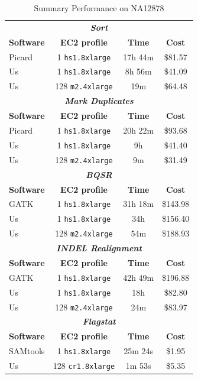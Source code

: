 \documentclass{acm_proc_article-sp}
\begin{document}
\begin{table}[h]
\caption{Summary Performance on NA12878}
\label{tab:overview}
\begin{center}
\begin{tabular}{ l c c c }
\hline
\multicolumn{4}{c}{\bf \textit{Sort}} \\
\bf Software & \bf EC2 profile & \bf Time & \bf Cost \\
\hline
Picard & 1 \texttt{hs1.8xlarge} & 17h 44m & \$81.57 \\
Us & 1 \texttt{hs1.8xlarge} & 8h 56m & \$41.09 \\
Us & 128 \texttt{m2.4xlarge} & 19m & \$64.48 \\ 
\hline
\multicolumn{4}{c}{\bf \textit{Mark Duplicates}} \\
\bf Software & \bf EC2 profile & \bf Time & \bf Cost  \\
\hline
Picard & 1 \texttt{hs1.8xlarge} & 20h 22m & \$93.68 \\
Us & 1 \texttt{hs1.8xlarge} & 9h & \$41.40 \\
Us & 128 \texttt{m2.4xlarge} & 9m & \$31.49 \\
\hline
\multicolumn{4}{c}{\bf \textit{BQSR}} \\
\bf Software & \bf EC2 profile & \bf Time & \bf Cost  \\
\hline
GATK & 1 \texttt{hs1.8xlarge} & 31h 18m & \$143.98 \\
Us & 1 \texttt{hs1.8xlarge} & 34h & \$156.40 \\
Us & 128 \texttt{m2.4xlarge} & 54m & \$188.93 \\
\hline
\multicolumn{4}{c}{\bf \textit{INDEL Realignment}} \\
\bf Software & \bf EC2 profile & \bf Time & \bf Cost  \\
\hline
GATK & 1 \texttt{hs1.8xlarge} & 42h 49m & \$196.88 \\
Us & 1 \texttt{hs1.8xlarge} & 18h & \$82.80 \\
Us & 128 \texttt{m2.4xlarge} & 24m & \$83.97 \\
\hline
\multicolumn{4}{c}{\bf \textit{Flagstat}} \\
\bf Software & \bf EC2 profile & \bf Time & \bf Cost  \\
\hline
SAMtools & 1 \texttt{hs1.8xlarge} & 25m 24s & \$1.95 \\
Us & 128 \texttt{cr1.8xlarge} & 1m 53s & \$5.35 \\
\hline
\end{tabular}
\end{center}
\end{table}
\end{document}
